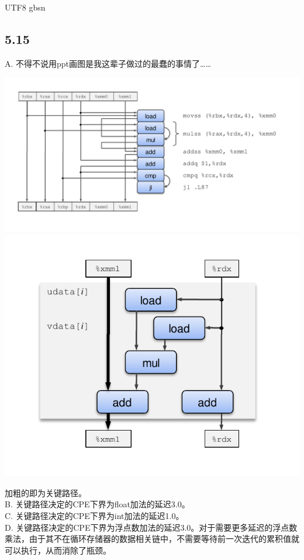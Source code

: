 \documentclass {article}
\begin{document}
\begin {CJK*} {UTF8} {gbsn}
			\subsection{5.15}
				A. 不得不说用ppt画图是我这辈子做过的最蠢的事情了……
				
				\includegraphics[width=\textwidth]{fpb2a-sequential.pdf}
				\includegraphics{fpb2a-flow-abstract.pdf}
				
				加粗的即为关键路径。\\
				
				B. 关键路径决定的CPE下界为float加法的延迟3.0。\\
				
				C. 关键路径决定的CPE下界为int加法的延迟1.0。\\
				
				D. 关键路径决定的CPE下界为浮点数加法的延迟3.0。对于需要更多延迟的浮点数乘法，由于其不在循环存储器的数据相关链中，不需要等待前一次迭代的累积值就可以执行，从而消除了瓶颈。\\
				

\end{CJK*}
\end{document}
